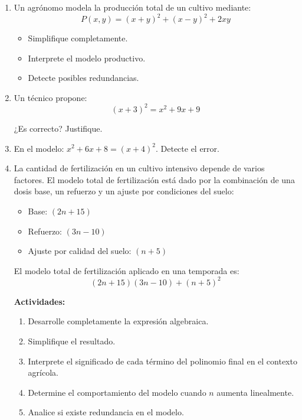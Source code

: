 \documentclass[12pt]{article}
\begin{document}
\begin{enumerate}
		
		
		\item Un agrónomo modela la producción total de un cultivo mediante:
		\[
		P(x,y) = (x+y)^2 + (x-y)^2 + 2xy
		\]
		
		\begin{itemize}
			\item Simplifique completamente.
			\item Interprete el modelo productivo.
			\item Detecte posibles redundancias.
		\end{itemize}
		
		\item Un técnico propone:
		\[
		(x+3)^2 = x^2 + 9x + 9
		\]
		
		¿Es correcto? Justifique.
		
		\item En el modelo: $x^2 + 6x + 8 = (x+4)^2$. Detecte el error.
		
		
		\newpage
		
		\vspace*{0.5em}
		
	
		
		
		\item La cantidad de fertilización en un cultivo intensivo depende de varios factores. El modelo total de fertilización está dado por la combinación de una dosis base, un refuerzo y un ajuste por condiciones del suelo:
		
		\begin{itemize}
			\item Base: $(2n + 15)$
			\item Refuerzo: $(3n - 10)$
			\item Ajuste por calidad del suelo: $(n + 5)$
		\end{itemize}
		
		El modelo total de fertilización aplicado en una temporada es:
		\[
		(2n + 15)(3n - 10) + (n + 5)^2
		\]
		
		\textbf{Actividades:}
		\begin{enumerate}[label=\alph*)]
			\item Desarrolle completamente la expresión algebraica.
			\item Simplifique el resultado.
			\item Interprete el significado de cada término del polinomio final en el contexto agrícola.
			\item Determine el comportamiento del modelo cuando $n$ aumenta linealmente.
			\item Analice si existe redundancia en el modelo.
		\end{enumerate}
		

\end{enumerate}
\end{document}
